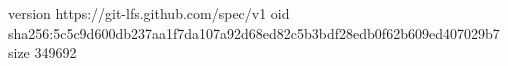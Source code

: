 version https://git-lfs.github.com/spec/v1
oid sha256:5c5c9d600db237aa1f7da107a92d68ed82c5b3bdf28edb0f62b609ed407029b7
size 349692
